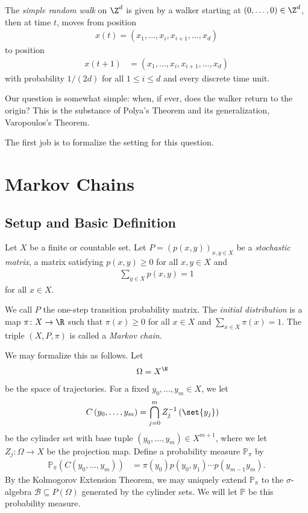 \documentclass[10pt]{mypackage}
\begin{document}
\RaggedRight
\begin{definition}
  The \textit{simple random walk} on $\Z^d$ is given by a walker starting at $\left( 0,\dots,0 \right)\in \Z^d$, then at time $t$, moves from position 
  \begin{align*}
    x(t) = \left( x_1,\dots,x_i,x_{i+1},\dots,x_d \right)
  \end{align*}
  to position
  \begin{align*}
    x\left( t+1 \right) &= \left( x_1,\dots,x_i,x_{i+1},\dots,x_d \right)
  \end{align*}
  with probability $1/(2d)$ for all $1\leq i \leq d$ and every discrete time unit.
\end{definition}
Our question is somewhat simple: when, if ever, does the walker return to the origin? This is the substance of Polya's Theorem and its generalization, Varopoulos's Theorem.

The first job is to formalize the setting for this question.
\section{Markov Chains}%
\subsection{Setup and Basic Definition}%
\begin{definition}
  Let $X$ be a finite or countable set. Let $P = \left( p\left( x,y \right) \right)_{x,y\in X}$ be a \textit{stochastic matrix}, a matrix satisfying $p\left( x,y \right) \geq 0$ for all $x,y\in X$ and
  \begin{align*}
    \sum_{y\in X}p\left( x,y \right) = 1
  \end{align*}
  for all $x\in X$.

  We call $P$ the one-step transition probability matrix. The \textit{initial distribution} is a map $\pi\colon X\to \R$ such that $\pi(x)\geq 0$ for all $x\in X$ and $\sum_{x\in X}\pi(x) = 1$. The triple $\left( X,P,\pi \right)$ is called a \textit{Markov chain.}
\end{definition}
We may formalize this as follows. Let
\begin{align*}
  \Omega &= X^{\N}
\end{align*}
be the space of trajectories. For a fixed $y_0,\dots,y_m\in X$, we let
\begin{align*}
  C\left( y_0,\dots,y_m \right) &= \bigcap_{j=0}^{m}Z_j^{-1}\left( \set{y_j} \right)
\end{align*}
be the cylinder set with base tuple $\left( y_0,\dots,y_m \right)\in X^{m+1}$, where we let $Z_j\colon \Omega\to X$ be the projection map. Define a probability measure $ \mathbb{P}_{\pi} $ by
\begin{align*}
  \mathbb{P}_{\pi}\left( C\left( y_0,\dots,y_m \right) \right) &= \pi\left( y_0 \right)p\left( y_0,y_1 \right)\cdots p\left( y_{m-1}y_m \right).
\end{align*}
By the Kolmogorov Extension Theorem, we may uniquely extend $ \mathbb{P}_{\pi} $ to the $\sigma$-algebra $ \mathcal{B}\subseteq P\left( \Omega \right) $ generated by the cylinder sets. We will let $ \mathbb{P} $ be this probability measure.
\end{document}
